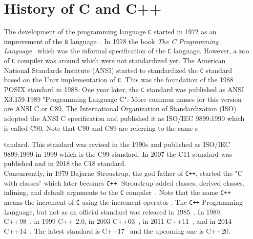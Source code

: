 \section{History of C and C++}
The development of the programming language \texttt{C} started in 1972 as an improvement of the \texttt{B} language~\cite{ritchie1993development}. In 1978 the book \textit{The C Programming Language}~\cite{kernighan2006c} which was the informal specification of the \texttt{C} language. However, a zoo of \texttt{C} compiler was around which were not standardized yet. The American National Standards Institute (ANSI) started to standardized the \texttt{C} standard based on the Unix implementation of \texttt{C}. This was the foundation of the 1988 POSIX standard in 1988. One year later, the \texttt{C} standard was published as ANSI X3.159-1989 "Programming Language C". More common names for this version are ANSI C or C89. The International Organization of Standardization (ISO) adopted the ANSI C specification and published it as ISO/IEC 9899:1990 which is called C90. Note that C90 and C89 are referring to the same s

tandard. This standard was revised in the 1990s and published as ISO/IEC 9899:1999 in 1999 which is the C99 standard. In 2007 the C11 standard was published and in 2018 the C18 standard.\\

Concurrently, in 1979 Bajarne Stroustrup, the god father of \texttt{C++}, started the "C with classes" which later becomes \texttt{C++}. Stroustrup added classes, derived classes, inlining, and default arguments to the \texttt{C} compiler~\cite{stroustrup1996history}. Note that the name \texttt{C++} means the increment of \texttt{C} using the increment operator \cpp{++}. The \texttt{C++} Programming Language, but not as an official standard was released in 1985~\cite{stroustrup2000c++}. In 1989, C++98~\cite{koenig1998standard}, in 1999 C++ 2.0, in 2003 C++03~\cite{c++2003iso}, in 2011 C++11~\cite{c++2011iso}, and in 2014 C++14~\cite{c++2014iso}. The latest standard is C++17~\cite{smith2017iso} and the upcoming one is C++20.


